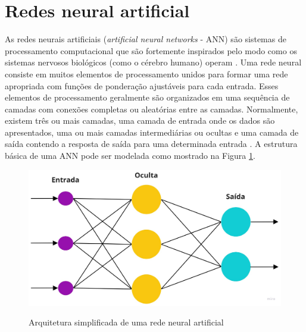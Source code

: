 \documentclass[
	12pt,				%
	oneside,			%
	a4paper,			%
	english,			%
	brazil				%
	]{abntex2ppgsi}
\begin{document}
\section{Redes neural artificial}
As redes neurais artificiais (\textit{artificial neural networks} - ANN) são sistemas de processamento computacional que são fortemente inspirados pelo modo como os sistemas nervosos biológicos (como o cérebro humano) operam \cite{o2015introduction}. Uma rede neural consiste em muitos elementos de processamento unidos para formar uma rede apropriada com funções de ponderação ajustáveis para cada entrada. Esses elementos de processamento geralmente são organizados em uma sequência de camadas com conexões completas ou aleatórias entre as camadas. Normalmente, existem três ou mais camadas, uma camada de entrada onde os dados são apresentados, uma ou mais camadas intermediárias ou ocultas e uma camada de saída contendo a resposta de saída para uma determinada entrada \cite{483329}. A estrutura básica de uma ANN pode ser modelada como mostrado na Figura \ref{fig:artificial_neural_networks_arch}. 

\begin{figure}[H]
    \centering
    \caption{Arquitetura simplificada de uma rede neural artificial}
    \includegraphics[scale=.20]{imagens/conceitos_basicos/rede_neural_artificial.jpg}
    \label{fig:artificial_neural_networks_arch}
\end{figure}
\end{document}
